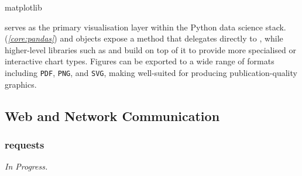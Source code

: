\documentclass[10pt]{article}
\begin{document}
\begin{core}[label=core:matplotlib]{matplotlib}
\begin{pyconsole}
        \end{pyconsole}


         serves as the primary visualisation layer within the Python data science stack.  (\textit{\autoref{core:pandas}})  and  objects expose a  method that delegates directly to , while higher-level libraries such as  and  build on top of it to provide more specialised or interactive chart types. Figures can be exported to a wide range of formats including \texttt{PDF}, \texttt{PNG}, and \texttt{SVG}, making  well-suited for producing publication-quality graphics.

      \end{core}


  \subsection{Web and Network Communication}

    \subsubsection{requests}

      \textit{In Progress.}

\end{document}
